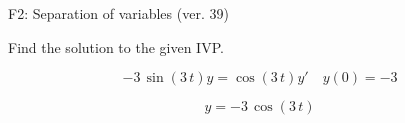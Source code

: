 \begin{exercise}
  \begin{exerciseTitle}F2: Separation of variables (ver. 39)\end{exerciseTitle}
  \begin{exerciseStatement}
    
Find the solution to the given IVP.

    
\[-3 \, \sin\left(3 \, t\right) y= \cos\left(3 \, t\right) y'\hspace{1em} y\left( 0 \right)= -3\]

  \end{exerciseStatement}
  \begin{exerciseAnswer}
    
\[y= -3 \, \cos\left(3 \, t\right)\]

  \end{exerciseAnswer}
\end{exercise}